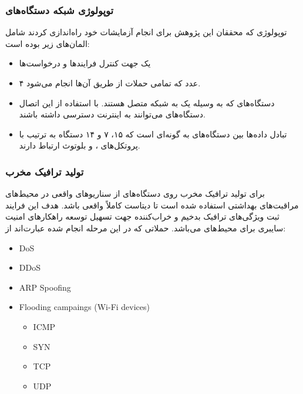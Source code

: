 \subsubsection{توپولوژی شبکه دستگاه‌های }

توپولوژی که محققان این پژوهش برای انجام آزمایشات خود راه‌اندازی کردند شامل
المان‌های زیر بوده است:

\begin{itemize}
    \item یک  جهت کنترل فرایند‌ها و درخواست‌ها
    \item ۴ عدد  که تمامی حملات از طریق آن‌ها انجام می‌شود.
    \item دستگاه‌های  که به وسیله یک  به شبکه متصل
    هستند. با استفاده از این اتصال دستگاه‌های  می‌توانند به اینترنت
    دسترسی داشته باشند.
    \item تبادل داده‌ها بین دستگاه‌های  به گونه‌ای است که ۱۵، ۷ و ۱۴
    دستگاه به ترتیب با پروتکل‌های ،  و بلوتوث ارتباط دارند.
\end{itemize}

\subsubsection{تولید ترافیک مخرب}

برای تولید ترافیک مخرب روی دستگاه‌های  از سناریو‌های واقعی در محیط‌های
مراقبت‌های بهداشتی استفاده شده است تا دیتاست کاملاً واقعی باشد. هدف این فرایند
ثبت ویژگی‌های ترافیک بدخیم و خراب‌کننده جهت تسهیل توسعه راهکار‌های امنیت سایبری
برای محیط‌های  می‌باشد. حملاتی که در این مرحله انجام شده عبارت‌اند از:

\begin{LTR}
    \begin{itemize}
        \item DoS
        \item DDoS
        \item ARP Spoofing
        \item Flooding campaings (Wi-Fi devices)
        \begin{itemize}
            \item ICMP
            \item SYN
            \item TCP
            \item UDP
        \end{itemize}
    \end{itemize}
\end{LTR}

